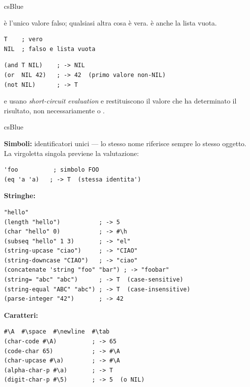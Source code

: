 \begin{refbox}[Booleani]{csBlue}
\label{sec:booleani}

 è l'unico valore falso; qualsiasi altra cosa è vera.
 è anche la lista vuota.

\begin{lstlisting}
T    ; vero
NIL  ; falso e lista vuota
\end{lstlisting}

\begin{lstlisting}
(and T NIL)    ; -> NIL
(or  NIL 42)   ; -> 42  (primo valore non-NIL)
(not NIL)      ; -> T
\end{lstlisting}

 e  usano \textit{short-circuit evaluation} e
restituiscono il valore che ha determinato il risultato,
non necessariamente  o .

\end{refbox}

\begin{refbox}{csBlue}
\label{sec:simboli}

\textbf{Simboli:} identificatori unici — lo stesso nome riferisce sempre lo stesso oggetto.
La virgoletta singola  previene la valutazione:\nopagebreak

\begin{lstlisting}
'foo          ; simbolo FOO
(eq 'a 'a)   ; -> T  (stessa identita')
\end{lstlisting}

\textbf{Stringhe:}\nopagebreak

\begin{lstlisting}
"hello"
(length "hello")           ; -> 5
(char "hello" 0)           ; -> #\h
(subseq "hello" 1 3)       ; -> "el"
(string-upcase "ciao")     ; -> "CIAO"
(string-downcase "CIAO")   ; -> "ciao"
(concatenate 'string "foo" "bar") ; -> "foobar"
(string= "abc" "abc")      ; -> T  (case-sensitive)
(string-equal "ABC" "abc") ; -> T  (case-insensitive)
(parse-integer "42")       ; -> 42
\end{lstlisting}

\textbf{Caratteri:}\nopagebreak

\begin{lstlisting}
#\A  #\space  #\newline  #\tab
(char-code #\A)          ; -> 65
(code-char 65)           ; -> #\A
(char-upcase #\a)        ; -> #\A
(alpha-char-p #\a)       ; -> T
(digit-char-p #\5)       ; -> 5  (o NIL)
\end{lstlisting}

\end{refbox}

